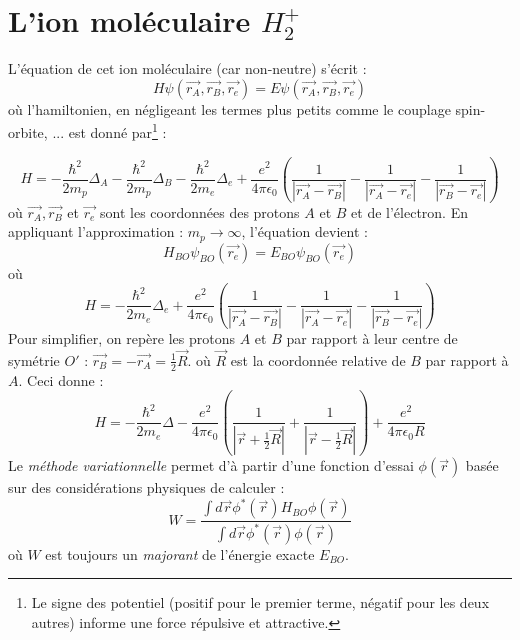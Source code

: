 \documentclass	[11pt, a4paper, openany]{book}
\begin{document}
\section{L'ion moléculaire $H_2^+$}
L'équation de cet ion moléculaire (car non-neutre) s'écrit :
\begin{equation}
H\psi(\vec{r_A},\vec{r_B},\vec{r_e}) = E\psi(\vec{r_A},\vec{r_B},\vec{r_e})
\end{equation}
où l'hamiltonien, en négligeant les termes plus petits comme le couplage spin-orbite, ... est
donné par\footnote{Le signe des potentiel (positif pour le premier terme, négatif pour les deux
autres) informe une force répulsive et attractive.} : 

    \begin{equation}
H =	-\frac{\hbar^2}{2m_p}\Delta_A-\frac{\hbar^2}{2m_p}\Delta_B-\frac{\hbar^2}{2m_e}\Delta_e
    +\frac{e^2}{4\pi\epsilon_0} \left(\frac{1}{|\vec{r_A}-\vec{r_B}|}-\frac{1}{|\vec{r_A}-
    \vec{r_e}|}-\frac{1}{|\vec{r_B}-\vec{r_e}|}\right)
    \end{equation}
    où $\vec{r_A},\vec{r_B}$ et $\vec{r_e}$ sont les coordonnées des protons $A$ et $B$ et 
    de l'électron. En appliquant l'approximation : $m_p \rightarrow \infty$, l'équation devient : 
    \begin{equation}
	H_{BO}\psi_{BO}(\vec{r_e}) = E_{BO}\psi_{BO}(\vec{r_e})
    \end{equation}
    où
    \begin{equation}
H =	-\frac{\hbar^2}{2m_e}\Delta_e
    +\frac{e^2}{4\pi\epsilon_0} \left(\frac{1}{|\vec{r_A}-\vec{r_B}|}-\frac{1}{|\vec{r_A}-
    \vec{r_e}|}-\frac{1}{|\vec{r_B}-\vec{r_e}|}\right)
    \end{equation}
Pour simplifier, on repère les protons $A$ et $B$ par rapport à leur centre de symétrie $O'$ :
$\vec{r_B}=-\vec{r_A}=\frac{1}{2}\vec{R}$. où $\vec{R}$ est la coordonnée relative de $B$ par
rapport à $A$. Ceci donne :
    \begin{equation}
H =	-\frac{\hbar^2}{2m_e}\Delta
    -\frac{e^2}{4\pi\epsilon_0} \left(\frac{1}{|\vec{r}+\frac{1}{2}\vec{R}|}+\frac{1}{|\vec{r}-
   \frac{1}{2} \vec{R}|}\right)+\frac{e^2}{4\pi\epsilon_0R}
    \end{equation}
Le \textit{méthode variationnelle} permet d'à partir d'une fonction d'essai $\phi(\vec{r})$ 
basée sur des considérations physiques de calculer :
\begin{equation}
W = \frac{\int d\vec{r}\phi^*(\vec{r})H_{BO}\phi(\vec{r})}{\int d\vec{r}\phi^*(\vec{r})\phi(
\vec{r})}
\end{equation}
où $W$ est toujours un \textit{majorant} de l'énergie exacte $E_{BO}$.\\
\end{document}
